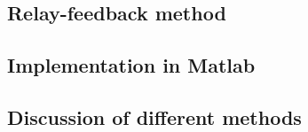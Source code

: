 \subsection{Relay-feedback method} \label{sec:condes:Relayfeedback}

\subsection{Implementation in Matlab} \label{sec:condes:implementation_matlab}

\subsection{Discussion of different methods} \label{sec:condes:discussion}